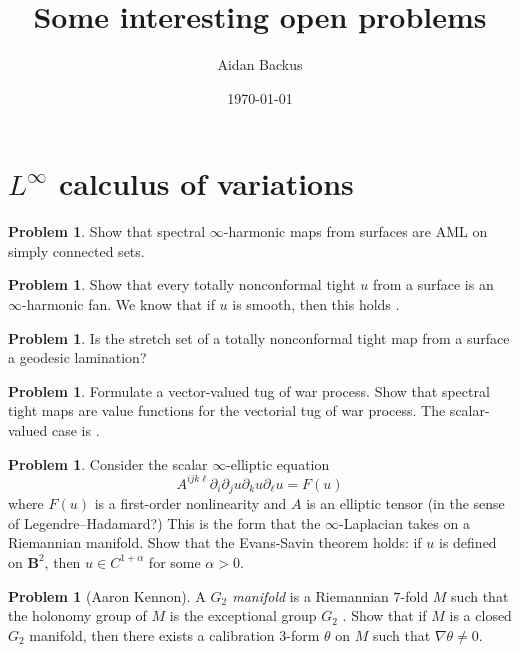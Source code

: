\documentclass[reqno,11pt]{amsart}
\title{Some interesting open problems}
\author{Aidan Backus}
\date{\today}
\newcommand{\Ball}{\mathbf{B}}
\newcommand{\dfn}[1]{\emph{#1}\index{#1}}
\theoremstyle{definition}
\newtheorem{problem}[theorem]{Problem}
\numberwithin{equation}{section}
\begin{document}
\maketitle

\section{\texorpdfstring{$L^\infty$}{L-infinity} calculus of variations}
\begin{problem}
Show that spectral $\infty$-harmonic maps from surfaces are AML on simply connected sets.
\end{problem}

\begin{problem}
Show that every totally nonconformal tight $u$ from a surface is an $\infty$-harmonic fan.
We know that if $u$ is smooth, then this holds \cite[Proposition 3.5]{Sheffield12}.
\end{problem}

\begin{problem}
Is the stretch set of a totally nonconformal tight map from a surface a geodesic lamination?
\end{problem}

\begin{problem}
Formulate a vector-valued tug of war process. Show that spectral tight maps are value functions for the vectorial tug of war process.
The scalar-valued case is \cite{Peres_2008}.
\end{problem}

\begin{problem}
Consider the scalar $\infty$-elliptic equation 
$$A^{ijk\ell} \partial_i \partial_j u \partial_k u \partial_\ell u = F(u)$$
where $F(u)$ is a first-order nonlinearity and $A$ is an elliptic tensor (in the sense of Legendre--Hadamard?)
This is the form that the $\infty$-Laplacian takes on a Riemannian manifold.
Show that the Evans-Savin theorem \cite{Evans08} holds: if $u$ is defined on $\Ball^2$, then $u \in C^{1 + \alpha}$ for some $\alpha > 0$.
\end{problem}

\begin{problem}[Aaron Kennon]
A \dfn{$G_2$ manifold} is a Riemannian $7$-fold $M$ such that the holonomy group of $M$ is the exceptional group $G_2$ \cite{kennon2018g2manifolds}.
Show that if $M$ is a closed $G_2$ manifold, then there exists a calibration $3$-form $\theta$ on $M$ such that $\nabla \theta \neq 0$.
\end{problem}
\end{document}
